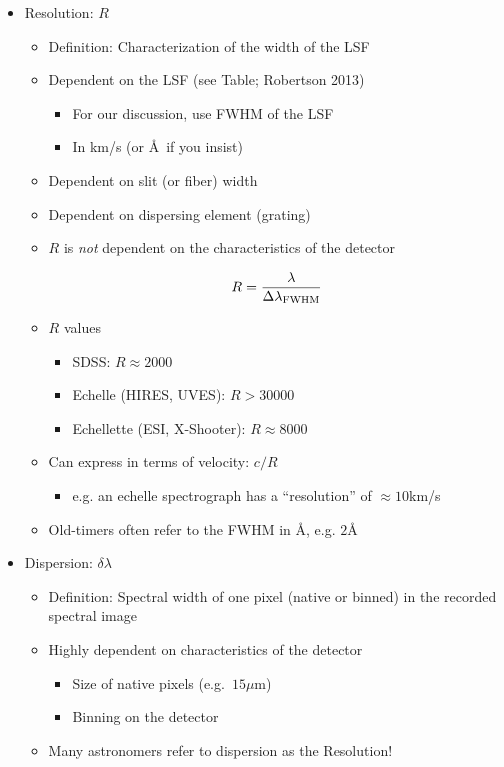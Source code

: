 \documentclass[12pt,letterpaper]{article}
\begin{document}
\begin{Aenumerate}
\begin{itemize}
\begin{itemize}
  	\end{itemize}
  \item Resolution: $R$ 
  	\begin{itemize}
  	\item Definition: Characterization of the width of the LSF
  	\item Dependent on the LSF (see Table; Robertson 2013)
  		\begin{itemize}
  		\item For our discussion, use FWHM of the LSF
  		\item In km/s (or \AA\ if you insist)
  		\end{itemize}
	\item Dependent on slit (or fiber) width
	\item Dependent on dispersing element (grating)
  	\item $R$ is {\it not} dependent on the characteristics of the detector

	\begin{equation}
	R = \frac{\lambda}{\Delta\lambda_{\rm FWHM}}
	\end{equation}
  	\item $R$ values 
  		\begin{itemize}
  		\item SDSS: $R \approx 2000$
  		\item Echelle (HIRES, UVES): $R > 30000$
  		\item Echellette (ESI, X-Shooter): $R \approx 8000$
  		\end{itemize}
	\item Can express in terms of velocity:  $c/R$
		\begin{itemize}
		\item e.g. an echelle spectrograph has a ``resolution'' of $\approx 10$km/s
		\end{itemize}
	\item Old-timers often refer to the FWHM in \AA, e.g. $2$\AA
  	\end{itemize}
  \item Dispersion: $\delta\lambda$
  	\begin{itemize}
  	\item Definition: Spectral width of one pixel (native or binned)
  	in the recorded spectral image
  	\item Highly dependent on characteristics of the detector
  		\begin{itemize}
  		\item Size of native pixels (e.g.\ $15 \mu$m)
  		\item Binning on the detector
  		\end{itemize}
  	\item Many astronomers refer to dispersion as the Resolution!
  	\end{itemize}


\end{itemize}
\end{Aenumerate}
\end{document}
